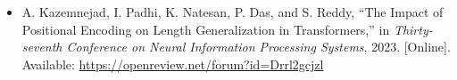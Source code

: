 \begin{itemize}[leftmargin=3em, label={}]
  \item[\tm{[29]}] A. Kazemnejad, I. Padhi, K. Natesan, P. Das, and S. Reddy, ``The Impact of Positional Encoding on Length Generalization in Transformers,'' in \textit{Thirty-seventh Conference on Neural Information Processing Systems}, 2023. [Online]. Available: \url{https://openreview.net/forum?id=Drrl2gcjzl}
\end{itemize}
